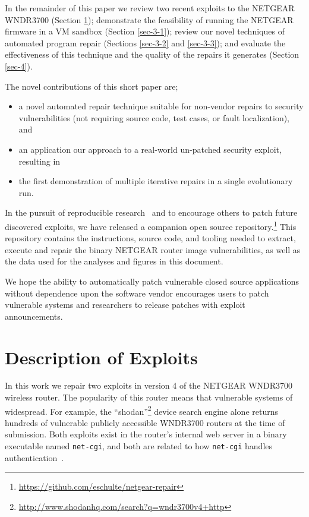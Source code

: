 \documentclass{sigcomm-alternate}
\begin{document}
In the remainder of this paper we review two recent exploits to the
NETGEAR WNDR3700 (Section \ref{sec-2}); demonstrate the feasibility
of running the NETGEAR firmware in a VM sandbox (Section \ref{sec-3-1});
review our novel techniques of automated program repair (Sections
\ref{sec-3-2} and \ref{sec-3-3}); and evaluate the effectiveness of this
technique and the quality of the repairs it generates (Section
\ref{sec-4}).

The novel contributions of this short paper are;
\begin{itemize}
\item a novel automated repair technique suitable for non-vendor repairs to
security vulnerabilities (not requiring source code, test cases, or fault
localization), and 
\item an application our approach to a real-world un-patched
security exploit, resulting in
\item the first demonstration of multiple iterative repairs in a single
evolutionary run.
\end{itemize}

In the pursuit of reproducible
research~\cite{buckheit1995wavelab,mesirov2010accessible} and to encourage
others to patch
future discovered exploits, we have released a companion open source
repository.\footnote{\url{https://github.com/eschulte/netgear-repair}}
This repository contains the instructions, source
code, and tooling needed to extract, execute and repair the binary
NETGEAR router image vulnerabilities, as well as the data used for the
analyses and figures in this document.

We hope the ability to automatically patch vulnerable closed source
applications without dependence upon the software vendor encourages
users to patch vulnerable systems and researchers to release patches
with exploit announcements.

\section{Description of Exploits}
\label{sec-2}
In this work we repair two exploits in version 4 of the NETGEAR WNDR3700
wireless router. The popularity of this router means that vulnerable
systems of widespread. For example, the
``shodan''\footnote{\url{http://www.shodanhq.com/search?q=wndr3700v4+http}}
device search engine alone returns hundreds of vulnerable publicly
accessible WNDR3700 routers at the time of submission. 
Both exploits exist in the router's internal web server in a binary
executable named \texttt{net-cgi}, and both are related to how
\texttt{net-cgi} handles authentication~\cite{zcutlip}.
\end{document}
